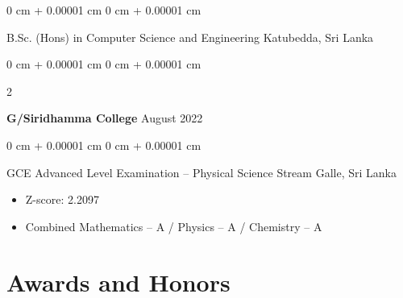 \documentclass[10pt, letterpaper]{article}
\newenvironment{highlights}{
    \begin{itemize}[
        topsep=0.10 cm,
        parsep=0.10 cm,
        partopsep=0pt,
        itemsep=0pt,
        leftmargin=0 cm + 10pt
    ]
}{
    \end{itemize}
} %
\newenvironment{onecolentry}{
    \begin{adjustwidth}{
        0 cm + 0.00001 cm
    }{
        0 cm + 0.00001 cm
    }
}{
    \end{adjustwidth}
} %
\newenvironment{twocolentry}[2][]{
    \onecolentry
    \def\secondColumn{#2}
    \setcolumnwidth{\fill, 4.5 cm}
    \begin{paracol}{2}
}{
    \switchcolumn \raggedleft \secondColumn
    \end{paracol}
    \endonecolentry
} %
\begin{document}
        \vspace{0.10 cm}
        \begin{onecolentry}
            B.Sc. (Hons) in Computer Science and Engineering \hfill Katubedda, Sri Lanka
        \end{onecolentry}
        \vspace{0.30 cm}
        \begin{twocolentry}{
            August 2022
        }
            \textbf{G/Siridhamma College}\end{twocolentry}

        \vspace{0.10 cm}
        \begin{onecolentry}
            GCE Advanced Level Examination – Physical Science Stream \hfill Galle, Sri Lanka
            \begin{highlights}
                \item Z-score: 2.2097
                \item Combined Mathematics – A / Physics – A / Chemistry – A
            \end{highlights}
        \end{onecolentry}



    \section{Awards and Honors}
    
\end{document}
